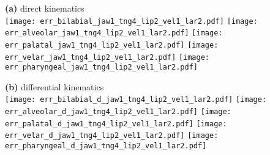 \documentclass[varwidth=7.5in]{standalone}
\begin{document}
\raggedright

{\bf (a)} direct kinematics\\
\texttt{[image: err\_bilabial\_jaw1\_tng4\_lip2\_vel1\_lar2.pdf]}%
\texttt{[image: err\_alveolar\_jaw1\_tng4\_lip2\_vel1\_lar2.pdf]}%
\texttt{[image: err\_palatal\_jaw1\_tng4\_lip2\_vel1\_lar2.pdf]}%
\texttt{[image: err\_velar\_jaw1\_tng4\_lip2\_vel1\_lar2.pdf]}%
\texttt{[image: err\_pharyngeal\_jaw1\_tng4\_lip2\_vel1\_lar2.pdf]}

{\bf (b)} differential kinematics\\
\texttt{[image: err\_bilabial\_d\_jaw1\_tng4\_lip2\_vel1\_lar2.pdf]}%
\texttt{[image: err\_alveolar\_d\_jaw1\_tng4\_lip2\_vel1\_lar2.pdf]}%
\texttt{[image: err\_palatal\_d\_jaw1\_tng4\_lip2\_vel1\_lar2.pdf]}%
\texttt{[image: err\_velar\_d\_jaw1\_tng4\_lip2\_vel1\_lar2.pdf]}%
\texttt{[image: err\_pharyngeal\_d\_jaw1\_tng4\_lip2\_vel1\_lar2.pdf]}
\end{document}
